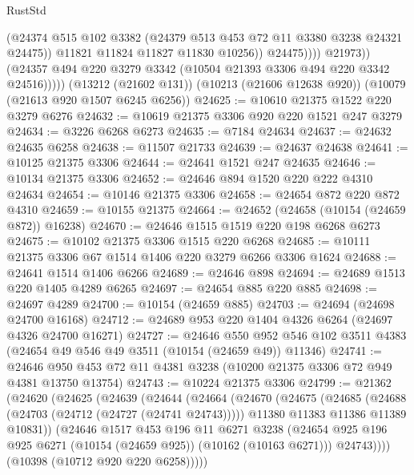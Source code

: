 \begin{lexlean}{RustStd}
\begin{coremodule}
{\begin{coremodule}
{{{{{{{{{{{{{{{{{{{{{{{{{{                          (@24374
                            @515
                            @102
                            @3382
                            (@24379 @513 @453 @72 @11 @3380 @3238 @24321 @24475))
                          @11821
                          @11824
                          @11827
                          @11830
                          @10256))
                      @24475))))
              @21973))
          (@24357 @494 @220 @3279 @3342 (@10504 @21393 @3306 @494 @220 @3342 @24516)))))
    (@13212 (@21602 @131))
    (@10213 (@21606 @12638 @920))
    (@10079 (@21613 @920 @1507 @6245 @6256))
@24625 := @10610 @21375 @1522 @220 @3279 @6276
@24632 := @10619 @21375 @3306 @920 @220 @1521 @247 @3279
@24634 := @3226 @6268 @6273
@24635 := @7184 @24634
@24637 := @24632 @24635 @6258
@24638 := @11507 @21733
@24639 := @24637 @24638
@24641 := @10125 @21375 @3306
@24644 := @24641 @1521 @247 @24635
@24646 := @10134 @21375 @3306
@24652 := @24646 @894 @1520 @220 @222 @4310 @24634
@24654 := @10146 @21375 @3306
@24658 := @24654 @872 @220 @872 @4310
@24659 := @10155 @21375
@24664 := @24652 (@24658 (@10154 (@24659 @872)) @16238)
@24670 := @24646 @1515 @1519 @220 @198 @6268 @6273
@24675 := @10102 @21375 @3306 @1515 @220 @6268
@24685 := @10111 @21375 @3306 @67 @1514 @1406 @220 @3279 @6266 @3306 @1624
@24688 := @24641 @1514 @1406 @6266
@24689 := @24646 @898
@24694 := @24689 @1513 @220 @1405 @4289 @6265
@24697 := @24654 @885 @220 @885
@24698 := @24697 @4289
@24700 := @10154 (@24659 @885)
@24703 := @24694 (@24698 @24700 @16168)
@24712 := @24689 @953 @220 @1404 @4326 @6264 (@24697 @4326 @24700 @16271)
@24727 := @24646
    @550
    @952
    @546
    @102
    @3511
    @4383
    (@24654 @49 @546 @49 @3511 (@10154 (@24659 @49)) @11346)
@24741 := @24646 @950 @453 @72 @11 @4381 @3238 (@10200 @21375 @3306 @72 @949 @4381 @13750 @13754)
@24743 := @10224 @21375 @3306
@24799 := @21362
    (@24620
      (@24625
        (@24639
          (@24644
            (@24664
              (@24670
                (@24675
                  (@24685
                    (@24688 (@24703 (@24712 (@24727 (@24741 @24743)))))
                    @11380
                    @11383
                    @11386
                    @11389
                    @10831))
                (@24646
                  @1517
                  @453
                  @196
                  @11
                  @6271
                  @3238
                  (@24654 @925 @196 @925 @6271 (@10154 (@24659 @925)) (@10162 (@10163 @6271)))
                  @24743))))
          (@10398 (@10712 @920 @220 @6258)))))
}}}}}}}}}}}}}}}}}}}}}}}}}}
\end{coremodule}}
\end{coremodule}
\end{lexlean}
